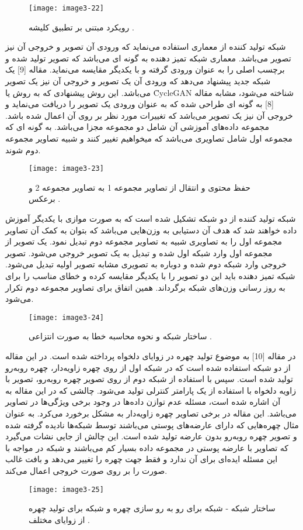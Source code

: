   \begin{figure}[h]
\centering
  \texttt{[image: image3-22]}
  \caption{رویکرد مبتنی بر تطبیق کلیشه  \cite{ref1}.}
  \label{image3-22}
\end{figure}
\noindent
شبکه تولید کننده از معماری  استفاده می‌نماید که ورودی آن تصویر و خروجی آن نیز تصویر می‌باشد. معماری شبکه تمیز دهنده به گونه ای می‌باشد که تصویر تولید شده و برچسب اصلی را به عنوان ورودی گرفته و با یکدیگر مقایسه می‌نماید. 
مقاله [9] یک شبکه  جدید پیشنهاد می‌دهد که ورودی آن یک تصویر و خروجی آن نیز یک تصویر می‌باشد. این روش پیشنهادی که به روش  یا \r{CycleGAN} شناخته می‌شود، مشابه مقاله [8] به گونه ای طراحی شده که به عنوان ورودی یک تصویر را دریافت می‌نماید و خروجی آن نیز یک تصویر می‌باشد که تغییرات مورد نظر بر روی آن اعمال شده باشد. مجموعه داده‌های آموزشی آن شامل دو مجموعه مجزا می‌باشد. به گونه ای که مجموعه اول شامل تصاویری می‌باشد که میخواهیم تغییر کنند و شبیه تصاویر مجموعه دوم شوند.
\begin{figure}[h]
\centering
  \texttt{[image: image3-23]}
  \caption{حفظ محتوی و انتقال  از تصاویر مجموعه 1 به تصاویر مجموعه 2 و برعکس \cite{ref1}.}
  \label{image3-23}
\end{figure}
\noindent
شبکه تولید کننده از دو شبکه  تشکیل شده است که به صورت موازی با یکدیگر آموزش داده خواهند شد که هدف آن‌ دستیابی به وزن‌هایی می‌باشد که بتوان به کمک آن تصاویر مجموعه اول را به تصاویری شبیه به تصاویر مجموعه دوم تبدیل نمود. یک تصویر از مجموعه اول وارد شبکه اول شده و تبدیل به یک تصویر خروجی می‌شود. تصویر خروجی وارد شبکه دوم شده و دوباره به تصویری مشابه تصویر اولیه تبدیل می‌شود. شبکه تمیز دهنده باید این دو تصویر را با یکدیگر مقایسه کرده و خطای مناسب را برای به روز رسانی وزن‌های شبکه برگرداند. همین اتفاق برای تصاویر مجموعه دوم تکرار می‌شود.
 \begin{figure}[h]
\centering
  \texttt{[image: image3-24]}
  \caption{ساختار شبکه  و نحوه محاسبه خطا به صورت انتزاعی \cite{ref1}.}
  \label{image3-24}
\end{figure} 
\noindent
در مقاله [10] به موضوع تولید چهره در زوایای دلخواه پرداخته شده است. در این مقاله از دو شبکه  استفاده شده است که در شبکه اول از روی چهره زاویه‌دار، چهره روبه‌رو تولید شده است. سپس با استفاده از شبکه  دوم از روی تصویر چهره روبه‌رو، تصویر با زاویه دلخواه با استفاده از یک پارامتر کنترلی تولید می‌شود.
\noindent
چالشی که در این مقاله به آن اشاره شده است، مسئله عدم توازن داده‌ها در وجود برخی ویژگی‌ها در تصاویر می‌باشد. این مقاله در برخی تصاویر چهره زاویه‌دار به مشکل برخورد می‌کرد. به عنوان مثال چهره‌هایی که دارای عارضه‌های پوستی می‌باشند توسط شبکه‌ها نادیده گرفته شده و تصویر چهره روبه‌رو بدون عارضه تولید شده است. این چالش از جایی نشات می‌گیرد که تصاویر با عارضه پوستی در مجموعه داده بسیار کم می‌باشند و شبکه در مواجه با این مسئله ایده‌ای برای آن ندارد و فقط جهت چهره را تغییر می‌دهد و بافت غالب صورت را بر روی صورت خروجی اعمال می‌کند. 
\begin{figure}[h]
\centering
  \texttt{[image: image3-25]}
  \caption{ساختار شبکه  - شبکه  برای رو به رو سازی چهره و شبکه  برای تولید چهره از زوایای مختلف \cite{ref1}.}
  \label{image3-1}
\end{figure}

